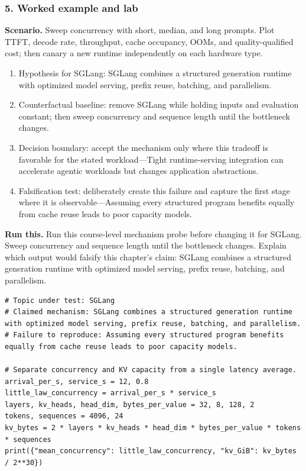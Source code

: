 \subsubsection*{5. Worked example and lab}
\textbf{Scenario.} Sweep concurrency with short, median, and long prompts. Plot TTFT, decode rate, throughput, cache occupancy, OOMs, and quality-qualified cost; then canary a new runtime independently on each hardware type.
\begin{enumerate}
\item Hypothesis for SGLang: SGLang combines a structured generation runtime with optimized model serving, prefix reuse, batching, and parallelism.
\item Counterfactual baseline: remove SGLang while holding inputs and evaluation constant; then sweep concurrency and sequence length until the bottleneck changes.
\item Decision boundary: accept the mechanism only where this tradeoff is favorable for the stated workload—Tight runtime-serving integration can accelerate agentic workloads but changes application abstractions.
\item Falsification test: deliberately create this failure and capture the first stage where it is observable—Assuming every structured program benefits equally from cache reuse leads to poor capacity models.
\end{enumerate}
\textbf{Run this.} Run this course-level mechanism probe before changing it for SGLang. Sweep concurrency and sequence length until the bottleneck changes. Explain which output would falsify this chapter's claim: SGLang combines a structured generation runtime with optimized model serving, prefix reuse, batching, and parallelism.
\begin{Verbatim}[fontsize=\scriptsize]
# Topic under test: SGLang
# Claimed mechanism: SGLang combines a structured generation runtime with optimized model serving, prefix reuse, batching, and parallelism.
# Failure to reproduce: Assuming every structured program benefits equally from cache reuse leads to poor capacity models.

# Separate concurrency and KV capacity from a single latency average.
arrival_per_s, service_s = 12, 0.8
little_law_concurrency = arrival_per_s * service_s
layers, kv_heads, head_dim, bytes_per_value = 32, 8, 128, 2
tokens, sequences = 4096, 24
kv_bytes = 2 * layers * kv_heads * head_dim * bytes_per_value * tokens * sequences
print({"mean_concurrency": little_law_concurrency, "kv_GiB": kv_bytes / 2**30})
\end{Verbatim}
